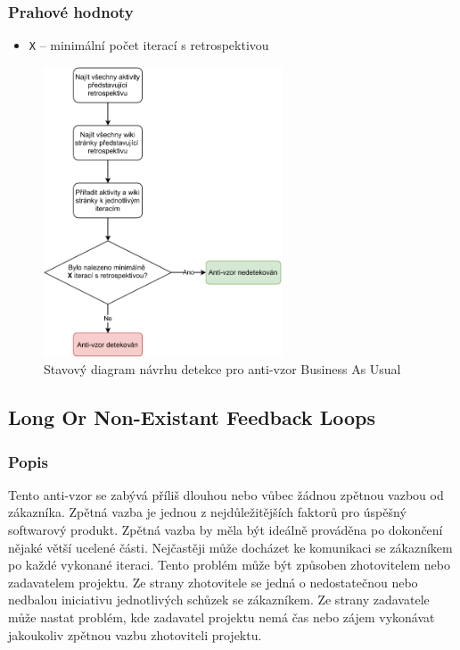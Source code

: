 \documentclass[czech,DP]{thesiskiv}
\begin{document}
\subsubsection{Prahové hodnoty}
\begin{itemize}
    \item \texttt{X} -- minimální počet iterací s retrospektivou
\end{itemize}
\begin{figure}[!htb]
    \centering
    \includegraphics[width=200pt]{img/business_as_usual.pdf}
    \caption{Stavový diagram návrhu detekce pro anti-vzor Business As Usual}
    \label{img:business_as_usualas}
\end{figure}
\FloatBarrier
\subsection{Long Or Non-Existant Feedback Loops}
\subsubsection{Popis}
Tento anti-vzor se zabývá příliš dlouhou nebo vůbec žádnou zpětnou vazbou od zákazníka. Zpětná vazba je jednou z nejdůležitějších faktorů pro úspěšný softwarový produkt. Zpětná vazba by měla být ideálně prováděna po dokončení nějaké větší ucelené části. Nejčastěji může docházet ke komunikaci se zákazníkem po každé vykonané iteraci. Tento problém může být způsoben zhotovitelem nebo zadavatelem projektu. Ze strany zhotovitele se jedná o nedostatečnou nebo nedbalou iniciativu jednotlivých schůzek se zákazníkem. Ze strany zadavatele může nastat problém, kde zadavatel projektu nemá čas nebo zájem vykonávat jakoukoliv zpětnou vazbu zhotoviteli projektu. \cite{scrum_but_anti_patterns}
\end{document}
